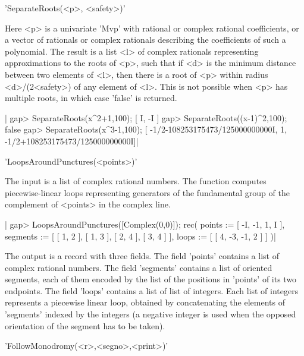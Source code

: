 
'SeparateRoots(<p>, <safety>)'

Here  <p>  is  a univariate  'Mvp'  with  rational  or  complex  rational
coefficients, or a  vector of rationals or  complex rationals describing
the  coefficients of  such a  polynomial. The  result is  a list  <l> of
complex rationals representing approximations to  the roots of <p>, such
that if  <d> is the minimum  distance between two elements  of <l>, then
there is a root of <p> within radius <d>/(2\*<safety>) of any element of
<l>. This  is not possible  when <p> has  multiple roots, in  which case
'false' is returned.

|    gap> SeparateRoots(x^2+1,100);
    [ I, -I ]
    gap> SeparateRoots((x-1)^2,100);
    false
    gap> SeparateRoots(x^3-1,100);  
    [ -1/2-108253175473/125000000000I, 1, -1/2+108253175473/125000000000I]|


'LoopsAroundPunctures(<points>)'

The input is  a list of complex rational numbers.  The function computes
piecewise-linear loops representing generators  of the fundamental group
of the complement of <points> in the complex line.

|    gap> LoopsAroundPunctures([Complex(0,0)]);
    rec(
      points := [ -I, -1, 1, I ],
      segments := [ [ 1, 2 ], [ 1, 3 ], [ 2, 4 ], [ 3, 4 ] ],
      loops := [ [ 4, -3, -1, 2 ] ] )|

The output is a record with  three fields. The field 'points' contains a
list of complex  rational numbers. The field 'segments'  contains a list
of oriented segments, each of them  encoded by the list of the positions
in 'points' of  its two endpoints. The field 'loops'  contains a list of
list of  integers. Each list  of integers represents a  piecewise linear
loop, obtained  by concatenating the  elements of 'segments'  indexed by
the integers (a negative integer is used when the opposed orientation of
the segment has to be taken).


'FollowMonodromy(<r>,<segno>,<print>)'

